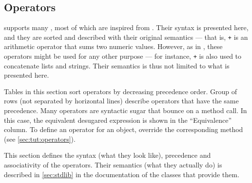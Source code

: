 \subsection{Operators}
\label{sec:lang:op}
\us supports many , most of which are inspired from
\Cxx. Their syntax is presented here, and they are sorted and described with
their original semantics --- that is, \lstinline|+| is an arithmetic
operator that sums two numeric values. However, as in \Cxx, these operators
might be used for any other purpose --- for instance, \lstinline|+| is also
used to concatenate lists and strings.  Their semantics is thus not limited
to what is presented here.

Tables in this section sort operators by decreasing precedence order.  Group
of rows (not separated by horizontal lines) describe operators that have the
same precedence. Many operators are syntactic sugar that bounce on a method
call. In this case, the equivalent desugared expression is shown in the
``Equivalence'' column.  To define an operator for an object, override the
corresponding method (see \autoref{sec:tut:operators}).

This section defines the syntax (what they look like), precedence and
associativity of the operators. Their semantics (what they actually do) is
described in \autoref{sec:stdlib} in the documentation of the classes that
provide them.


\newcommand{\operator}[6][]{%
  \lstinline@#2@ & \lstinline@#3@ & #4 & #5 & \lstinline@#6@#1%
}

\newcommand{\boperator}[3]{%
  \operator{#1}{a #1 b}{#2}{#3}{a.'#1'(b)}%
}

\newcommand{\poperator}[3]{%
  \operator{#1}{#1a}{#2}{#3}{a.'#1'()}%
}

\newcommand{\operatorin}     {\operator  {in}     {a in b}       {None}     {Membership}            {b.has(a)}          }
\newcommand{\operatornotin}  {\operator  {not in} {a not in b}   {None}     {Non-membership}        {b.hasNot(a)}      }
\newcommand{\operatorsub}    {\operator  {[]}   {a[args]}        {Left}     {Subscript}             {a.'[]'(args)}          }
\newcommand{\operatorsubass} {\operator  {[] =} {a[args] = v}    {Right}     {Subscript assignment}  {a.'[]='(args, v)}      }

